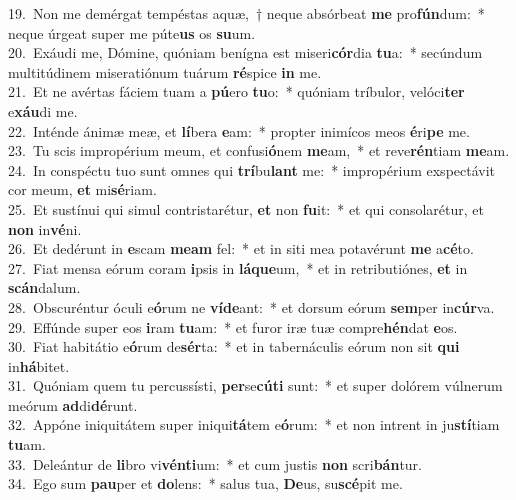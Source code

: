 {19.~}Non me demérgat tempéstas aquæ,~† neque absórbeat \textbf{me} pro\textbf{fún}dum:~* neque úrgeat super me púte\textbf{us} os \textbf{su}um.\\
{20.~}Exáudi me, Dómine, quóniam benígna est miseri\textbf{cór}dia \textbf{tu}a:~* secúndum multitúdinem miseratiónum tuárum \textbf{ré}spice \textbf{in} me.\\
{21.~}Et ne avértas fáciem tuam a \textbf{pú}ero \textbf{tu}o:~* quóniam tríbulor, velóci\textbf{ter} e\textbf{xáu}di me.\\
{22.~}Inténde ánimæ meæ, et \textbf{lí}bera \textbf{e}am:~* propter inimícos meos \textbf{é}ri\textbf{pe} me.\\
{23.~}Tu scis impropérium meum, et confusi\textbf{ó}nem \textbf{me}am,~* et reve\textbf{rén}tiam \textbf{me}am.\\
{24.~}In conspéctu tuo sunt omnes qui \textbf{trí}bu\textbf{lant} me:~* impropérium exspectávit cor meum, \textbf{et} mi\textbf{sé}riam.\\
{25.~}Et sustínui qui simul contristarétur, \textbf{et} non \textbf{fu}it:~* et qui consolarétur, et \textbf{non} in\textbf{vé}ni.\\
{26.~}Et dedérunt in \textbf{e}scam \textbf{me}\textbf{am} fel:~* et in siti mea potavérunt \textbf{me} a\textbf{cé}to.\\
{27.~}Fiat mensa eórum coram \textbf{i}psis in \textbf{lá}\textbf{que}um,~* et in retributiónes, \textbf{et} in \textbf{scán}dalum.\\
{28.~}Obscuréntur óculi e\textbf{ó}rum ne \textbf{ví}\textbf{de}ant:~* et dorsum eórum \textbf{sem}per in\textbf{cúr}va.\\
{29.~}Effúnde super eos \textbf{i}ram \textbf{tu}am:~* et furor iræ tuæ compre\textbf{hén}dat \textbf{e}os.\\
{30.~}Fiat habitátio e\textbf{ó}rum de\textbf{sér}ta:~* et in tabernáculis eórum non sit \textbf{qui} in\textbf{há}bitet.\\
{31.~}Quóniam quem tu percussísti, \textbf{per}se\textbf{cú}\textbf{ti} sunt:~* et super dolórem vúlnerum meórum \textbf{ad}di\textbf{dé}runt.\\
{32.~}Appóne iniquitátem super iniqui\textbf{tá}tem e\textbf{ó}rum:~* et non intrent in ju\textbf{stí}tiam \textbf{tu}am.\\
{33.~}Deleántur de \textbf{li}bro vi\textbf{vén}\textbf{ti}um:~* et cum justis \textbf{non} scri\textbf{bán}tur.\\
{34.~}Ego sum \textbf{pau}per et \textbf{do}lens:~* salus tua, \textbf{De}us, su\textbf{scé}pit me.\\
